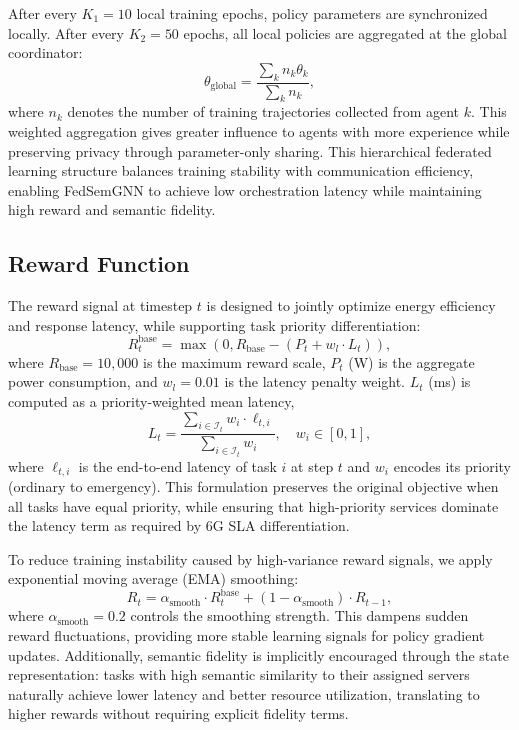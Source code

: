 After every $K_1 = 10$ local training epochs, policy parameters are synchronized locally. After every $K_2 = 50$ epochs, all local policies are aggregated at the global coordinator:
\begin{equation}
	\theta_{\text{global}} = \frac{\sum_{k} n_k \theta_k}{\sum_{k} n_k},
\end{equation}
where $n_k$ denotes the number of training trajectories collected from agent $k$. This weighted aggregation gives greater influence to agents with more experience while preserving privacy through parameter-only sharing. This hierarchical federated learning structure balances training stability with communication efficiency, enabling FedSemGNN to achieve low orchestration latency while maintaining high reward and semantic fidelity.

\subsection{Reward Function}
The reward signal at timestep $t$ is designed to jointly optimize energy efficiency and response latency, while supporting task priority differentiation:
\begin{equation}
	R_t^{\text{base}} = \max\!\left(0, R_{\text{base}} - \left(P_t + w_l \cdot L_t\right)\right),
	\label{eq:base_reward}
\end{equation}
where $R_{\text{base}} = 10{,}000$ is the maximum reward scale, $P_t$ (W) is the aggregate power consumption, and $w_l = 0.01$ is the latency penalty weight. $L_t$ (ms) is computed as a priority-weighted mean latency,
\begin{equation}
	L_t = \frac{\sum_{i \in \mathcal{I}_t} w_i \cdot \ell_{t,i}}{\sum_{i \in \mathcal{I}_t} w_i},\quad w_i \in [0,1],
\end{equation}
where $\ell_{t,i}$ is the end-to-end latency of task $i$ at step $t$ and $w_i$ encodes its priority (ordinary to emergency). This formulation preserves the original objective when all tasks have equal priority, while ensuring that high-priority services dominate the latency term as required by 6G SLA differentiation.

To reduce training instability caused by high-variance reward signals, we apply exponential moving average (EMA) smoothing:
\begin{equation}
	R_t = \alpha_{\text{smooth}} \cdot R_t^{\text{base}} + (1 - \alpha_{\text{smooth}}) \cdot R_{t-1},
	\label{eq:smoothed_reward}
\end{equation}
where $\alpha_{\text{smooth}} = 0.2$ controls the smoothing strength. This dampens sudden reward fluctuations, providing more stable learning signals for policy gradient updates. Additionally, semantic fidelity is implicitly encouraged through the state representation: tasks with high semantic similarity to their assigned servers naturally achieve lower latency and better resource utilization, translating to higher rewards without requiring explicit fidelity terms.

